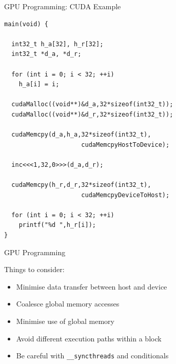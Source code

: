 \documentclass[xcolor=dvipsnames]{beamer}
\begin{document}
%
\begin{frame}[fragile]{GPU Programming: CUDA Example}

\begin{block}{}
\begin{tiny}
\begin{verbatim} 
main(void) {
  
  int32_t h_a[32], h_r[32]; 
  int32_t *d_a, *d_r;
  
  for (int i = 0; i < 32; ++i) 
    h_a[i] = i;

  cudaMalloc((void**)&d_a,32*sizeof(int32_t));
  cudaMalloc((void**)&d_r,32*sizeof(int32_t));

  cudaMemcpy(d_a,h_a,32*sizeof(int32_t),
                     cudaMemcpyHostToDevice);
  
  inc<<<1,32,0>>>(d_a,d_r); 

  cudaMemcpy(h_r,d_r,32*sizeof(int32_t),
                     cudaMemcpyDeviceToHost);

  for (int i = 0; i < 32; ++i) 
    printf("%d ",h_r[i]);
}
\end{verbatim}
\end{tiny}
\end{block} 
\end{frame} 
%

\begin{frame}{GPU Programming} 

  Things to consider:

  \begin{itemize} 
    \item Minimise data transfer between host and device
    \item Coalesce global memory accesses
    \item Minimise use of global memory 
    \item Avoid different execution paths within a block
    \item Be careful with {\tt \_\_syncthreads} and conditionals
  \end{itemize} 
  
\end{frame} 


%
\end{document}
